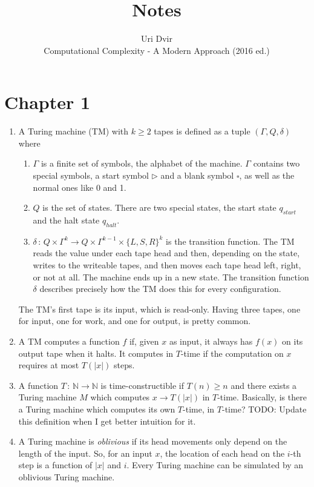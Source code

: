 \documentclass[12pt]{article}
\title{Notes}
\author{Uri Dvir \\ Computational Complexity - A Modern Approach (2016 ed.)}
\begin{document}
\maketitle

\section*{Chapter 1}

\begin{enumerate}
\item{
A Turing machine (TM) with $k \geq 2$ tapes is defined as a tuple $(\Gamma, Q, \delta)$ where
\begin{enumerate}
\item{$\Gamma$ is a finite set of symbols, the alphabet of the machine. $\Gamma$ contains two special symbols, a start symbol $\triangleright$ and a blank symbol $\square$, as well as the normal ones like 0 and 1.}
\item{$Q$ is the set of states. There are two special states, the start state $q_{start}$ and the halt state $q_{halt}$.}
\item{$\delta \,:\, Q \times \Gamma^k \rightarrow Q \times \Gamma^{k-1} \times \{ L, S, R \}^k$ is the transition function. The TM reads the value under each tape head and then, depending on the state, writes to the writeable tapes, and then moves each tape head left, right, or not at all. The machine ends up in a new state. The transition function $\delta$ describes precisely how the TM does this for every configuration.}
\end{enumerate}
The TM's first tape is its input, which is read-only. Having three tapes, one for input, one for work, and one for output, is pretty common.
}
\item{A TM computes a function $f$ if, given $x$ as input, it always has $f(x)$ on its output tape when it halts. It computes in $T$-time if the computation on $x$ requires at most $T(|x|)$ steps.}
\item{
A function $T \,:\, \mathbb{N} \rightarrow \mathbb{N}$ is time-constructible if $T(n) \geq n$ and there exists a Turing machine $M$ which computes $x \rightarrow T(|x|)$ in $T$-time. Basically, is there a Turing machine which computes its own $T$-time, in $T$-time? TODO: Update this definition when I get better intuition for it.
}
\item{
A Turing machine is \textit{oblivious} if its head movements only depend on the length of the input. So, for an input $x$, the location of each head on the $i$-th step is a function of $|x|$ and $i$. Every Turing machine can be simulated by an oblivious Turing machine.
}
\end{enumerate}
\end{document}
